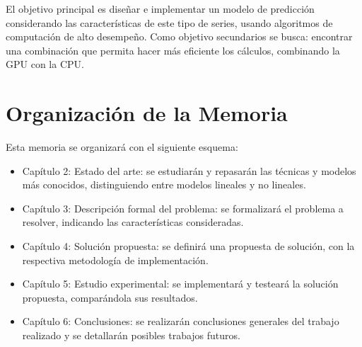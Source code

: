 El objetivo principal es diseñar e implementar un modelo de predicción considerando las características de este tipo de series, usando algoritmos de computación
de alto desempeño. Como objetivo secundarios se busca: encontrar una combinación que permita hacer más eficiente los cálculos, combinando la GPU con la CPU. 

\section{Organización de la Memoria}

Esta memoria se organizará con el siguiente esquema:
\begin{itemize}
	\item Capítulo 2: Estado del arte: se estudiarán y repasarán las técnicas y modelos más conocidos, distinguiendo entre modelos lineales y no lineales.
	\item Capítulo 3: Descripción formal del problema: se formalizará el problema a resolver, indicando las características consideradas.
	\item Capítulo 4: Solución propuesta: se definirá una propuesta de solución, con la respectiva metodología de implementación. 
	\item Capítulo 5: Estudio experimental: se implementará y testeará la solución propuesta, comparándola sus resultados.
	\item Capítulo 6: Conclusiones: se realizarán conclusiones generales del trabajo realizado y se detallarán posibles trabajos futuros.
\end{itemize}
